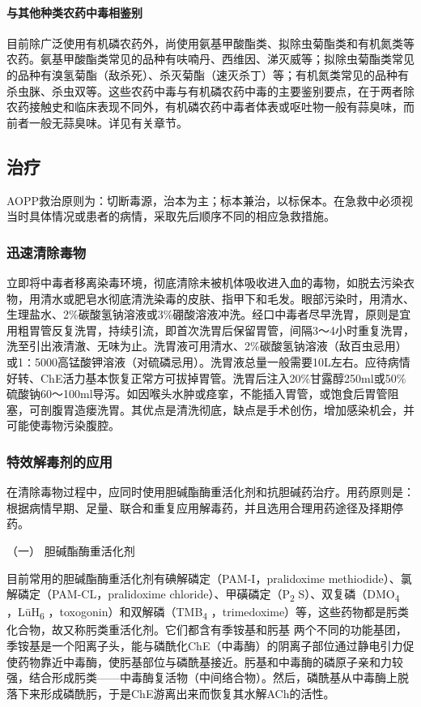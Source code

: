 \paragraph{与其他种类农药中毒相鉴别}

目前除广泛使用有机磷农药外，尚使用氨基甲酸酯类、拟除虫菊酯类和有机氮类等农药。氨基甲酸酯类常见的品种有呋喃丹、西维因、涕灭威等；拟除虫菊酯类常见的品种有溴氢菊酯（敌杀死）、杀灭菊酯（速灭杀丁）等；有机氮类常见的品种有杀虫脒、杀虫双等。这些农药中毒与有机磷农药中毒的主要鉴别要点，在于两者除农药接触史和临床表现不同外，有机磷农药中毒者体表或呕吐物一般有蒜臭味，而前者一般无蒜臭味。详见有关章节。

\subsection{治疗}

AOPP救治原则为：切断毒源，治本为主；标本兼治，以标保本。在急救中必须视当时具体情况或患者的病情，采取先后顺序不同的相应急救措施。

\subsubsection{迅速清除毒物}

立即将中毒者移离染毒环境，彻底清除未被机体吸收进入血的毒物，如脱去污染衣物，用清水或肥皂水彻底清洗染毒的皮肤、指甲下和毛发。眼部污染时，用清水、生理盐水、2\%碳酸氢钠溶液或3\%硼酸溶液冲洗。经口中毒者尽早洗胃，原则是宜用粗胃管反复洗胃，持续引流，即首次洗胃后保留胃管，间隔3～4小时重复洗胃，洗至引出液清澈、无味为止。洗胃液可用清水、2\%碳酸氢钠溶液（敌百虫忌用）或1∶5000高锰酸钾溶液（对硫磷忌用）。洗胃液总量一般需要10L左右。应待病情好转、ChE活力基本恢复正常方可拔掉胃管。洗胃后注入20\%甘露醇250ml或50\%硫酸钠60～100ml导泻。如因喉头水肿或痉挛，不能插入胃管，或饱食后胃管阻塞，可剖腹胃造瘘洗胃。其优点是清洗彻底，缺点是手术创伤，增加感染机会，并可能使毒物污染腹腔。

\subsubsection{特效解毒剂的应用}

在清除毒物过程中，应同时使用胆碱酯酶重活化剂和抗胆碱药治疗。用药原则是：根据病情早期、足量、联合和重复应用解毒药，并且选用合理用药途径及择期停药。

\hypertarget{text00139.htmlux5cux23CHP5-3-1-3-2-1}{}
（一） 胆碱酯酶重活化剂

目前常用的胆碱酯酶重活化剂有碘解磷定（PAM-I，pralidoxime
methiodide）、氯解磷定（PAM-CL，pralidoxime
chloride）、甲磺磷定（P\textsubscript{2}
S）、双复磷（DMO\textsubscript{4} ，LüH\textsubscript{6}
，toxogonin）和双解磷（TMB\textsubscript{4}
，trimedoxime）等，这些药物都是肟类化合物，故又称肟类重活化剂。它们都含有季铵基和肟基{}
两个不同的功能基团，季铵基是一个阳离子头，能与磷酰化ChE（中毒酶）的阴离子部位通过静电引力促使药物靠近中毒酶，使肟基部位与磷酰基接近。肟基和中毒酶的磷原子亲和力较强，结合形成肟类------中毒酶复活物（中间络合物）。然后，磷酰基从中毒酶上脱落下来形成磷酰肟，于是ChE游离出来而恢复其水解ACh的活性。

